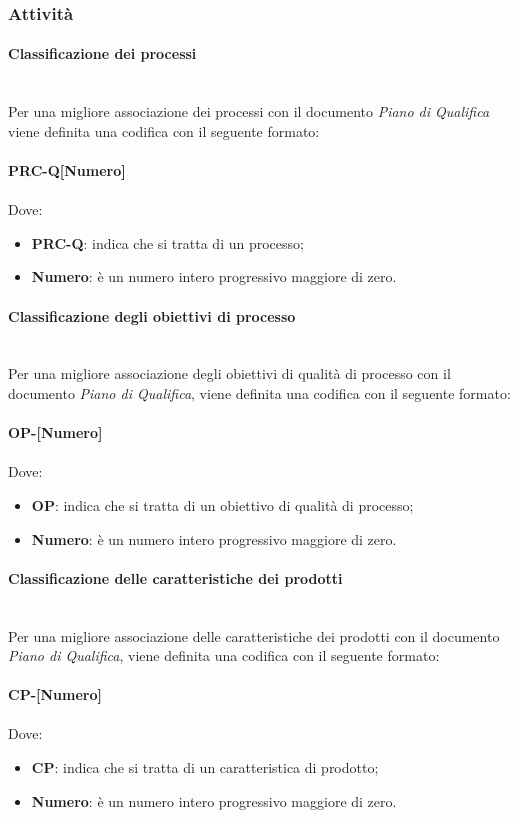 \subsubsection{Attività}
\paragraph{Classificazione dei processi} \mbox{}\\ [1mm]
Per una migliore associazione dei processi con il documento \textit{Piano di Qualifica} viene definita una codifica con il seguente formato: \\
\\ \textbf{PRC-Q[Numero]} \\
\\ Dove:
\begin{itemize}
	\item \textbf{PRC-Q}: indica che si tratta di un processo;
	\item \textbf{Numero}: è un numero intero progressivo maggiore di zero.
\end{itemize}

\paragraph{Classificazione degli obiettivi di processo} \mbox{}\\ [1mm]
Per una migliore associazione degli obiettivi di qualità di processo con il documento \textit{Piano di Qualifica}, viene definita una codifica con il seguente formato: \\
\\ \textbf{OP-[Numero]} \\
\\ Dove:
\begin{itemize}
	\item \textbf{OP}: indica che si tratta di un obiettivo di qualità di processo;
	\item \textbf{Numero}: è un numero intero progressivo maggiore di zero.
\end{itemize}

\paragraph{Classificazione delle caratteristiche dei prodotti} \mbox{}\\ [1mm]
Per una migliore associazione delle caratteristiche dei prodotti con il documento \textit{Piano di Qualifica}, viene definita una codifica con il seguente formato: \\
\\ \textbf{CP-[Numero]} \\
\\ Dove:
\begin{itemize}
	\item \textbf{CP}: indica che si tratta di un caratteristica di prodotto;
	\item \textbf{Numero}: è un numero intero progressivo maggiore di zero.
\end{itemize}

